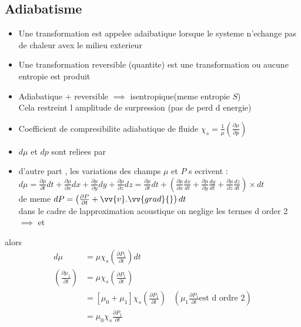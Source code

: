\documentclass[12pt]{book}
\newcommand{\x}{\chi}
\begin{document}
            \subsection{Adiabatisme}
                \begin{itemize}
                    \item Une transformation est appelee adaibatique lorsque le systeme n'echange pas de chaleur avex le milieu exterieur 
                    \item Une transformation reversible (quantite) est une transformation ou aucune entropie est produit 
                    \item Adiabatique + reversible $\implies$ isentropique(meme entropie $S$)\\
                        Cela restreint l amplitude de surpression (pas de perd d energie)
                    \item Coefficient de compresibilite adiabatique de fluide $\x_s = \frac{1}{\mu}(\frac{\partial \mu}{\partial p})$
                    \item $d\mu$ et $dp$ sont reliees par \\
                        \boxed{d\mu = \left( \frac{\partial \mu}{\partial P} \right)dp = \mu\x_sdP}
                    \item d'autre part , les variations des champs $\mu$ et $P$ s ecrivent : \\
                        $d\mu = \frac{\partial\mu}{\partial t}dt + \frac{\partial \mu}{\partial x}dx + \frac{\partial \mu}{\partial y}dy + \frac{\partial \mu}{\partial z}dz = \frac{\partial\mu}{\partial t}dt + \left( \frac{\partial \mu}{\partial x}\frac{dx}{dt} + \frac{\partial \mu}{\partial y}\frac{dy}{dt} + \frac{\partial \mu}{\partial z}\frac{dz}{dt}  \right) \times dt$ \\
                        de meme $dP=\left( \frac{\partial P}{\partial t} +\vv{v}.\vv{grad}{} \right)dt$ \\
                        dans le cadre de lapproximation acoustique on neglige les termes d order 2 \\ $\implies$  et
                \end{itemize}
                alors \begin{align*}
                    d\mu &= \mu\x_s(\frac{\partial P_1}{\partial t})dt \\
                    (\frac{\partial\mu_1}{\partial t}) &= \mu\x_s(\frac{\partial P_1}{\partial t})\\
                    &=[\mu_0 +\mu_1]\x_s\left( \frac{\partial P_1}{\partial t} \right) \; \; \; (\mu_1\frac{\partial P_1}{\partial t}\text{est d ordre 2}) \\
                    &=\mu_0\x_s\frac{\partial P_1}{\partial t}
                \end{align*}\\
\end{document}
